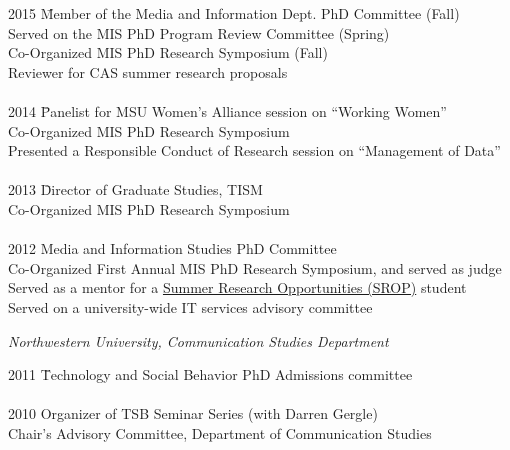 \documentclass[9pt]{extarticle}
\begin{document}
\begin{tabbing}
2015 \hspace{0.3in}\=  Member of the Media and Information Dept. PhD Committee (Fall) \\ %
\> Served on the MIS PhD Program Review Committee (Spring) \\ %
\> Co-Organized MIS PhD Research Symposium (Fall) \\ %
\> Reviewer for CAS summer research proposals \\\\ %

2014 \hspace{0.3in}\=  Panelist for MSU Women's Alliance session on ``Working Women'' \\ %
\> Co-Organized MIS PhD Research Symposium \\ %
\> Presented a Responsible Conduct of Research session on ``Management of Data'' \\\\ %

2013 \hspace{0.3in}\=  Director of Graduate Studies, TISM \\
\> Co-Organized MIS PhD Research Symposium \\\\ 

2012 \>  Media and Information Studies PhD Committee \\
\> Co-Organized First Annual MIS PhD Research Symposium, and served as judge \\ %
\> Served as a mentor for a \href{https://grad.msu.edu/srop}{Summer Research Opportunities (SROP)} student \\ %
\> Served on a university-wide IT services advisory committee \\ %
\end{tabbing}

\emph{Northwestern University, Communication Studies Department} \\
\vspace{1pt}
\begin{tabbing}
2011 \hspace{0.3in}\=  Technology and Social Behavior PhD Admissions committee \\\\
2010 \> Organizer of TSB Seminar Series (with Darren Gergle) \\
\> Chair's Advisory Committee, Department of Communication Studies \\
\end{tabbing}
\end{document}
